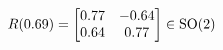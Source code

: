\documentclass[preview]{standalone}
\begin{document}
\begin{align*}
\special{dvisvgm:raw <g id='unique000'>}R(0.69) = \begin{bmatrix} 0.77 & -0.64 \\ 0.64 & 0.77 \end{bmatrix} \in \text{SO}(2)\special{dvisvgm:raw </g>}
\end{align*}
\end{document}
